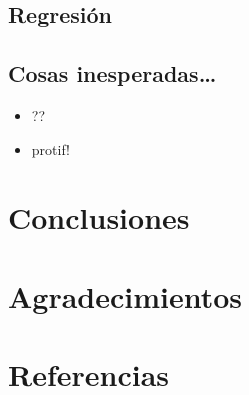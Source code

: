 \documentclass[spanish,a4paper]{book}
\providecommand{\tightlist}{%
  \setlength{\itemsep}{0pt}\setlength{\parskip}{0pt}}
\begin{document}
\section{Regresión}\label{regresion}

\section{Cosas inesperadas\ldots{}}\label{cosas-inesperadas}

\begin{itemize}
\tightlist
\item
  ??
\item
  protif!
\end{itemize}

\chapter{Conclusiones}\label{conclusiones}

\chapter{Agradecimientos}\label{agradecimientos}

\chapter{Referencias}\label{referencias}
\end{document}
